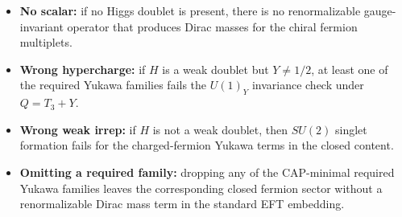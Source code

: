 \begin{itemize}
\item \textbf{No scalar:} if no Higgs doublet is present, there is no renormalizable gauge-invariant operator that produces Dirac masses for the chiral fermion multiplets.
\item \textbf{Wrong hypercharge:} if $H$ is a weak doublet but $Y\neq 1/2$, at least one of the required Yukawa families fails the $U(1)_Y$ invariance check under $Q=T_3+Y$.
\item \textbf{Wrong weak irrep:} if $H$ is not a weak doublet, then $SU(2)$ singlet formation fails for the charged-fermion Yukawa terms in the closed content.
\item \textbf{Omitting a required family:} dropping any of the CAP-minimal required Yukawa families leaves the corresponding closed fermion sector without a renormalizable Dirac mass term in the standard EFT embedding.
\end{itemize}